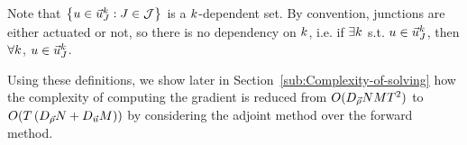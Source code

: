 Note that $\left\{ u\in\vec{u}_{J}^{k}:J\in\mathcal{J}\right\} $
is a $k$-dependent set. By convention, junctions are either actuated
or not, so there is no dependency on $k$, i.e. if $\exists k$
s.t. $u\in\vec{u}_{J}^{k}$, then $\forall k$, $u\in\vec{u}_{J}^{k}$.

Using these definitions, we show later in Section~\ref{sub:Complexity-of-solving}
how the complexity of computing the gradient is reduced from $O(D_{\vec{\rho}}NMT^{2})$
to $O(T\left(D_{\vec{\rho}}N+D_{\vec{u}}M\right))$
by considering the adjoint method over the forward method.

\begin{figure}
	\begin{centering}
\end{centering}
\end{figure}
